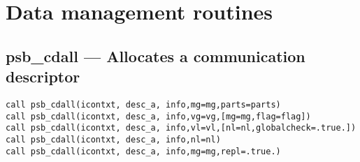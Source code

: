 \section{Data management routines}
\label{sec:toolsrout}


%
%
\subsection*{psb\_cdall --- Allocates a communication descriptor}

\begin{verbatim}
call psb_cdall(icontxt, desc_a, info,mg=mg,parts=parts)
call psb_cdall(icontxt, desc_a, info,vg=vg,[mg=mg,flag=flag])
call psb_cdall(icontxt, desc_a, info,vl=vl,[nl=nl,globalcheck=.true.])
call psb_cdall(icontxt, desc_a, info,nl=nl)
call psb_cdall(icontxt, desc_a, info,mg=mg,repl=.true.)
\end{verbatim}

